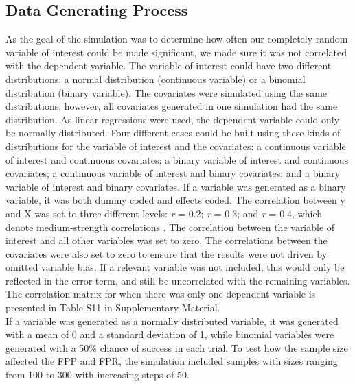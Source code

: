 \subsection{Data Generating Process}
As the goal of the simulation was to determine how often our completely random variable of interest could be made significant, we made sure it was not correlated with the dependent variable. The variable of interest could have two different distributions: a normal distribution (continuous variable) or a binomial distribution (binary variable). The covariates were simulated using the same distributions; however, all covariates generated in one simulation had the same distribution. As linear regressions were used, the dependent variable could only be normally distributed. Four different cases could be built using these kinds of distributions for the variable of interest and the covariates: a continuous variable of interest and continuous covariates; a binary variable of interest and continuous covariates; a continuous variable of interest and binary covariates; and a binary variable of interest and binary covariates. If a variable was generated as a binary variable, it was both dummy coded and effects coded.
The correlation between y and X was set to three different levels: \textit{r} = 0.2; \textit{r} = 0.3; and \textit{r} = 0.4, which denote medium-strength correlations \citep{Cohen1989}. The correlation between the variable of interest and all other variables was set to zero. The correlations between the covariates were also set to zero to ensure that the results were not driven by omitted variable bias. If a relevant variable was not included, this would only be reflected in the error term, and still be uncorrelated with the remaining variables. The correlation matrix for when there was only one dependent variable is presented in Table S11 in Supplementary Material. \\

If a variable was generated as a normally distributed variable, it was generated with a mean of 0 and a standard deviation of 1, while binomial variables were generated with a 50\% chance of success in each trial. To test how the sample size affected the FPP and FPR, the simulation included samples with sizes ranging from 100 to 300 with increasing steps of 50. 


